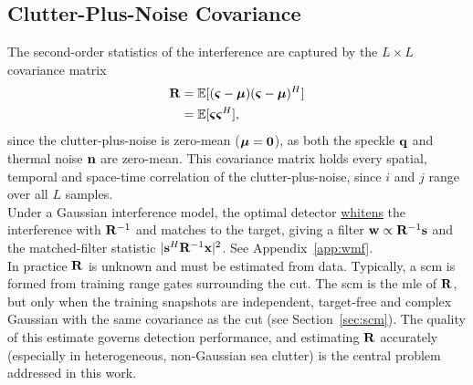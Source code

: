 \documentclass{article}
\begin{document}
\subsection{Clutter-Plus-Noise Covariance}
The second-order statistics of the interference are captured by the $L\times L$
covariance matrix \begin{align}
    \mathbf{R} &= \mathbb{E}[(\boldsymbol{\varsigma}-\boldsymbol{\mu})(\boldsymbol{\varsigma}-\boldsymbol{\mu})^H] \nonumber\\
         &= \mathbb{E}[\boldsymbol{\varsigma}\boldsymbol{\varsigma}^H], \nonumber
\end{align} 
since the clutter-plus-noise is zero-mean ($\boldsymbol{\mu}=\vb 0$), as both the speckle $\vb q$ and thermal noise $\vb n$ are zero-mean. This covariance matrix holds every spatial, temporal and space-time correlation of the clutter-plus-noise, since $i$ and $j$ range over all $L$ samples. \\

Under a Gaussian interference model, the optimal detector \underline{whitens} the interference with $\vb R^{-1}$ and matches to the target, giving a filter $\vb w \propto \vb R^{-1}\vb s$ and the matched-filter statistic $|\vb s^H \vb R^{-1}\vb x|^2$. See Appendix~\ref{app:wmf}.\\

In practice $\vb R$ is unknown and must be estimated from data. Typically, a \gls{scm} is formed from training range gates surrounding the \gls{cut}. The \gls{scm} is the \gls{mle} of $\mathbf{R}$, but only when the training snapshots are independent, target-free and complex Gaussian with the same covariance as the \gls{cut} (see Section~\ref{sec:scm}). The quality of this estimate governs detection performance, and estimating $\vb R$ accurately (especially in heterogeneous, non-Gaussian sea clutter) is the central problem addressed in this work.
\end{document}
